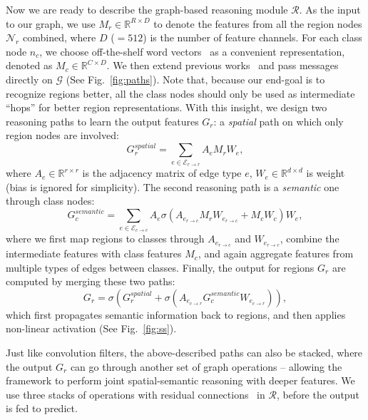 \documentclass[10pt,twocolumn,letterpaper]{article}
\begin{document}
Now we are ready to describe the graph-based reasoning module $\mathcal{R}$. As the input to our graph, we use $M_r{\in}\mathbb{R}^{R\times D}$ to denote the features from all the region nodes $\mathcal{N}_r$ combined, where $D$ (${=}512$) is the number of feature channels. For each class node $n_c$, we choose off-the-shelf word vectors~\cite{joulin2016fasttext} as a convenient representation, denoted as $M_c{\in}\mathbb{R}^{C\times D}$. We then extend previous works~\cite{scarselli2009graph,niepert2016learning} and pass messages directly on $\mathcal{G}$ (See Fig.~\ref{fig:paths}). Note that, because our end-goal is to recognize regions better, all the class nodes should only be used as intermediate ``hops'' for better region representations. With this insight, we design two reasoning paths to learn the output features $G_r$: a \emph{spatial} path on which only region nodes are involved:
\begin{equation}\label{spatial}
    G^{spatial}_r = \sum_{e{\in} \mathcal{E}_{r{\rightarrow}r}}{A_e M_r W_e},
\end{equation}
where $A_e{\in}\mathbb{R}^{r\times r}$ is the adjacency matrix of edge type $e$, $W_e{\in}\mathbb{R}^{d\times d}$ is weight (bias is ignored for simplicity). The second reasoning path is a \emph{semantic} one through class nodes:
\begin{equation}\label{semantic}
    G^{semantic}_c = \sum_{e{\in} \mathcal{E}_{c{\rightarrow}c}}{A_e \sigma(A_{e_{r{\rightarrow}c}} M_r W_{e_{r{\rightarrow}c}} + M_c W_c) W_e},
\end{equation}
where we first map regions to classes through $A_{e_{r{\rightarrow}c}}$ and $W_{e_{r{\rightarrow}c}}$, combine the intermediate features with class features $M_c$, and again aggregate features from multiple types of edges between classes.
Finally, the output for regions $G_r$ are computed by merging these two paths:
\begin{equation}\label{output}
    G_r = \sigma(G^{spatial}_r + \sigma(A_{e_{c{\rightarrow}r}} G^{semantic}_c W_{e_{c{\rightarrow}r}})),
\end{equation}
which first propagates semantic information back to regions, and then applies non-linear activation (See Fig.~\ref{fig:ss}).

Just like convolution filters, the above-described paths can also be stacked, where the output $G_r$ can go through another set of graph operations -- allowing the framework to perform joint spatial-semantic reasoning with deeper features. We use three stacks of operations with residual connections~\cite{he2016deep} in $\mathcal{R}$, before the output is fed to predict.
\end{document}

